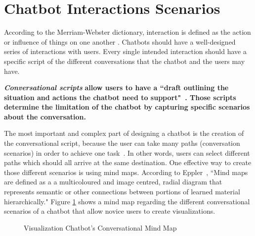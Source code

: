\documentclass[a4paper,10pt]{article}
\begin{document}
\section{Chatbot Interactions Scenarios}

According to the Merriam-Webster dictionary, interaction is defined as the action or influence of things on one another \cite{merriam-webster}.
Chatbots should have a well-designed series of interactions with users. Every single intended interaction should have a specific script of the different conversations that the chatbot and the users may have. 

\textbf{\textit{Conversational scripts}} \textbf{allow users to have a ``draft outlining the situation and actions the chatbot need to support"~\cite{CaseStudy}. Those scripts determine the limitation of the chatbot by capturing specific scenarios about the conversation.} 

The most important and complex part of designing a chatbot is the creation of the conversational script, because the user can take many paths (conversation scenarios) in order to achieve one task~\cite{designChatbotConversatio}. In other words, users can select different paths which should all arrive at the same destination. One effective way to create those different scenarios is using mind maps. According to Eppler~\cite{eppler2006comparison}, ``Mind maps are defined as a a multicoloured and image centred, radial diagram that represents semantic or other connections between portions of learned material hierarchically." Figure \ref{FigureMindMap} shows a mind map regarding the different conversational scenarios of a chatbot that allow novice users to create visualizations. 


\begin{figure}
    \caption{Visualization Chatbot's Conversational Mind Map}
   \label{FigureMindMap}
\end{figure}
\end{document}
